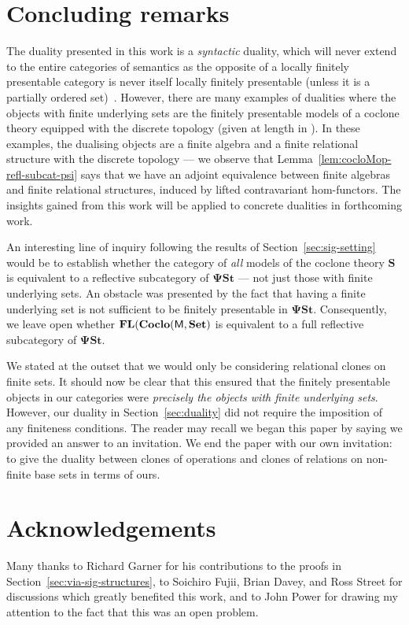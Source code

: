 \documentclass[11pt, a4paper, twoside,leqno]{amsart}
\newcommand{\cat}[1]{\mathbf{#1}}
\numberwithin{equation}{section}
\theoremstyle{plain}
\theoremstyle{definition}
\newcommand{\Set}{\cat{Set}}
\DeclareMathOperator{\FL}{\bf FL}
\DeclareMathOperator{\Pol}{\mathsf{Pol}}
\DeclareMathOperator{\Inv}{\mathsf{Inv}}
\begin{document}
\section{Concluding remarks}
\label{sec:concluding-remarks}

The duality presented in this work is a \emph{syntactic} duality,
which will never extend to the entire categories of semantics as the opposite of
a locally finitely presentable category is never itself locally
finitely presentable (unless it is a partially ordered
set)~\cite{Gabriel:1971aa}. However, there are many examples of dualities where the objects with finite underlying
sets are the finitely presentable models of a coclone
theory equipped with the discrete topology (given at length in \cite{Clark:1998aa}). In these examples, the
dualising objects are a finite algebra and a finite relational
structure with the discrete topology --- we observe that
Lemma~\ref{lem:cocloMop-refl-subcat-psi} says that we have an adjoint
  equivalence between finite algebras and finite relational
  structures, induced by lifted contravariant hom-functors. The insights
gained from this work will be applied to concrete dualities in forthcoming work.

An interesting line of inquiry following the results of Section~\ref{sec:sig-setting}
would be to establish whether the category of
\emph{all} models of the coclone theory \(\cat{S}\) is equivalent to a reflective
subcategory of \(\cat{\Psi St}\) --- not just those with finite
underlying sets. An obstacle was presented by the fact
that having a finite underlying set is not sufficient to be finitely
presentable in \(\cat{\Psi St}\). Consequently, we leave open whether
\(\FL(\cat{Coclo}(\mathsf{M},\Set)\) is equivalent to a full
reflective subcategory of \(\cat{\Psi St}\).

We stated at the outset that we would only be considering relational
clones 
on finite sets.
It should now be clear that this ensured that the finitely presentable
objects in our categories were \emph{precisely the objects with finite
  underlying sets}. However, our duality in Section~\ref{sec:duality} did not require the imposition
of any finiteness conditions.
The reader may recall we began this paper by saying we provided an answer
to an invitation. We end the
paper with our own invitation: to give the duality between clones
of operations and clones of relations on non-finite base sets in terms
of ours.



\section*{Acknowledgements}
Many thanks to Richard Garner for his contributions to the proofs in Section~\ref{sec:via-sig-structures}, to Soichiro Fujii, Brian Davey,
and Ross Street for discussions which greatly benefited this work, and
to John Power for drawing my attention to the fact that this was an open problem.





\end{document}
